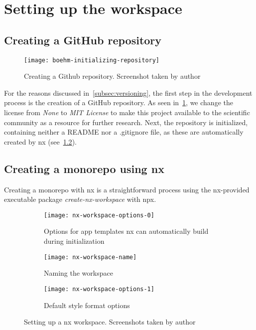 \section{Setting up the workspace}\label{sec:setting-up-the-workspace}

\subsection{Creating a GitHub repository}\label{subsec:creating-a-git-repository}

\begin{figure}[h]
    \centering
    \texttt{[image: boehm-initializing-repository]}
    \caption[Creating a Github repository]{Creating a Github repository. Screenshot taken by author}
    \label{fig:initializing-repository}
\end{figure}

For the reasons discussed in~\cref{subsec:versioning}, the first step in the development process is the creation of a GitHub repository.
As seen in~\cref{fig:initializing-repository}, we change the license from \emph{None} to \emph{MIT License} to make this project available to the scientific community as a resource for further research.
Next, the repository is initialized, containing neither a README nor a .gitignore file, as these are automatically created by nx (see~\cref{subsec:creating-a-monorepo-using-nx}).

\subsection{Creating a monorepo using nx}\label{subsec:creating-a-monorepo-using-nx}

Creating a monorepo with nx is a straightforward process using the nx-provided executable package \emph{create-nx-workspace} with \gls{npx}.

\begin{figure}[h]
    \begin{subfigure}[b]{\textwidth}
        \centering
        \texttt{[image: nx-workspace-options-0]}
        \caption{Options for app templates nx can automatically build during initialization}
        \label{fig:nx-workspace-options-0}
    \end{subfigure}
    \begin{subfigure}[b]{0.5\textwidth}
        \centering
        \texttt{[image: nx-workspace-name]}
        \caption{Naming the workspace}
        \label{fig:nx-workspace-name}
    \end{subfigure}
    \begin{subfigure}[b]{0.5\textwidth}
        \centering
        \texttt{[image: nx-workspace-options-1]}
        \caption{Default style format options}
        \label{fig:nx-workspace-options-1}
    \end{subfigure}
    \caption[Setting up a nx workspace]{Setting up a nx workspace. Screenshots taken by author}
    \label{fig:setting-up-nx-workspace}
\end{figure}


